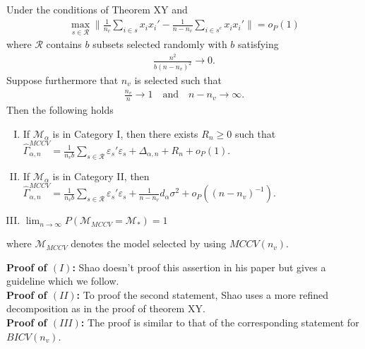 \documentclass[Research_Module_ES.tex]{subfiles}
\begin{document}
\begin{satz}
Under the conditions of Theorem XY and
\begin{align*}
\max_{s\in \mathcal{R}}\biggl\lVert \frac{1}{n_v}\sum_{i\in s}x_ix_i' - \frac{1}{n-n_v}\sum_{i\in s^c}x_ix_i'\biggr\rVert =o_P(1)
\end{align*}
where $\mathcal{R}$ contains $b$ subsets selected randomly with $b$ satisfying
\begin{align*}
\frac{n^2}{b(n-n_v)^2}\to 0.
\end{align*}
Suppose furthermore that $n_v$ is selected such that
\begin{align*}
\frac{n_v}{n}\to 1 \quad \textrm{and} \quad n-n_v \to \infty.
\end{align*}
Then the following holds
\begin{enumerate}[(I)]
\item If $\mathcal{M}_\alpha$ is in Category I, then there exists $R_n \ge 0$ such that $\hat{\Gamma}_{\alpha,n}^{MCCV} = \frac{1}{n_vb}\sum_{s\in \mathcal{R}}\varepsilon_s'\varepsilon_s + \Delta_{\alpha,n} + R_n + o_P(1)$.
\item If $\mathcal{M}_\alpha$ is in Category II, then $\hat{\Gamma}_{\alpha,n}^{MCCV} = \frac{1}{n_vb}\sum_{s\in \mathcal{R}}\varepsilon_s'\varepsilon_s + \frac{1}{n-n_v}d_\alpha\sigma^2  + o_P((n-n_v)^{-1})$.
\item $\lim_{n\to\infty}P(\mathcal{M}_{MCCV}=\mathcal{M}_\ast) = 1$
\end{enumerate}
where $\mathcal{M}_{MCCV}$ denotes the model selected by using $MCCV(n_v)$.
\end{satz}
\textbf{Proof of $(I)$:} 
Shao doesn't proof this assertion in his paper but gives a guideline which we follow.
\\
\textbf{Proof of $(II)$:}
To proof the second statement, Shao uses a more refined decomposition as in the proof of theorem XY. 
\\
\textbf{Proof of $(III)$:} 
The proof is similar to that of the corresponding statement for $BICV(n_v)$. 
\end{document}
